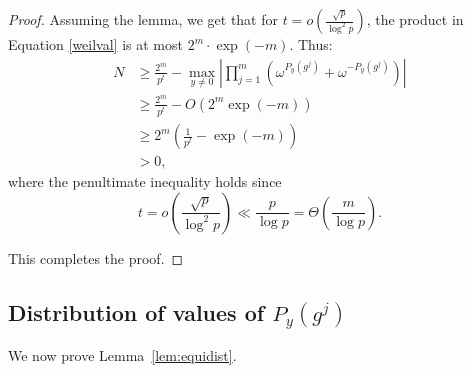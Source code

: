 \documentclass[10pt,a4paper]{article}
\begin{document}
\begin{proof}
Assuming the lemma, we get that for $t = o\left(\frac{\sqrt{p}}{\log^2 p}\right)$, the product in Equation \eqref{weilval} is at most $2^m \cdot \exp(-m)$.
Thus:
\begin{align*} N &\geq \frac{2^m}{p^t}  - \max_{y \neq 0} \left| \prod_{j=1}^m \left(\omega^{P_y(g^{j})} + \omega^{-P_y(g^{j})} \right) \right|\\
 &\geq \frac{2^m}{p^t}  - O(2^{m} \exp(-m))\\
 &\geq 2^m \left(\frac{1}{p^t} - \exp(-m)  \right)\\
 & > 0,
\end{align*}
where the penultimate inequality holds since
$$t = o\left( \frac{\sqrt{p}}{\log^2 p} \right) \ll \frac{p}{\log p} = \Theta\left( \frac{m}{\log p} \right).$$

This completes the proof.
\end{proof}


\subsection{Distribution of values of $P_y(g^j)$}

We now prove Lemma~\ref{lem:equidist}.
\end{document}
